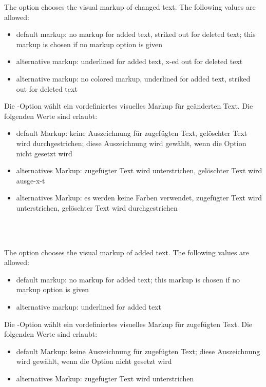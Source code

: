 \ifENGLISH
	The  option chooses the visual markup of changed text.
	The following values are allowed:
	\begin{itemize}
		\item {} default markup: no markup for added text, striked out for deleted text; this markup is chosen if no markup option is given
		\item {} alternative markup: underlined for added text, x-ed out for deleted text
		\item {} alternative markup: no colored markup, underlined for added text, striked out for deleted text
	\end{itemize}
\fi
	\ifGERMAN
	Die -Option wählt ein vordefiniertes visuelles Markup für geänderten Text.
	Die folgenden Werte sind erlaubt:
	\begin{itemize}
		\item {} default Markup: keine Auszeichnung für zugefügten Text, gelöschter Text wird durchgestrichen; diese Auszeichnung wird gewählt, wenn die Option nicht gesetzt wird
		\item {} alternatives Markup: zugefügter Text wird unterstrichen, gelöschter Text wird ausge-x-t
		\item {} alternatives Markup: es werden keine Farben verwendet, zugefügter Text wird unterstrichen, gelöschter Text wird durchgestrichen
	\end{itemize}
	\fi

\\
\\

\ifENGLISH
	The  option chooses the visual markup of added text.
	The following values are allowed:
	\begin{itemize}
		\item {} default markup: no markup for added text; this markup is chosen if no markup option is given
		\item {} alternative markup: underlined for added text
	\end{itemize}
\fi
	\ifGERMAN
	Die -Option wählt ein vordefiniertes visuelles Markup für zugefügten Text.
	Die folgenden Werte sind erlaubt:
	\begin{itemize}
		\item {} default Markup: keine Auszeichnung für zugefügten Text; diese Auszeichnung wird gewählt, wenn die Option nicht gesetzt wird
		\item {} alternatives Markup: zugefügter Text wird unterstrichen
	\end{itemize}
	\fi

